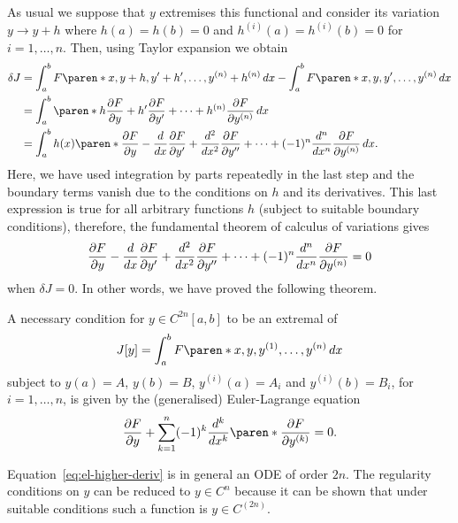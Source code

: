 \documentclass[11pt]{penrose}
\begin{document}
As usual we suppose that $y$ extremises this functional and consider its variation $y \to y + h$ where $h(a) = h(b) = 0$ and $h^{(i)}(a) = h^{(i)}(b) = 0$ for $i=1, \dots, n$. Then, using Taylor expansion we obtain
\begin{align}
    \delta J
    &= \int_a^b F\paren*{x, y+h, y'+h', \dots, y^{(n)}+h^{(n)}} \,dx
    - \int_a^b F\paren*{x, y, y', \dots, y^{(n)}} \,dx\\
    &= \int_a^b \paren*{h \frac{\pd F}{\pd y} + h' \frac{\pd F}{\pd y'} + \dots + h^{(n)} \frac{\pd F}{\pd y^{(n)}}} \,dx\\
    &= \int_a^b h(x) \paren*{ \frac{\pd F}{\pd y} - \frac{d}{dx} \frac{\pd F}{\pd y'} + \frac{d^2}{dx^2} \frac{\pd F}{\pd y''} + \dots + (-1)^n \frac{d^n}{dx^n} \frac{\pd F}{\pd y^{(n)}} } \,dx.
\end{align}
Here, we have used integration by parts repeatedly in the last step and the boundary terms vanish due to the conditions on $h$ and its derivatives. This last expression is true for all arbitrary functions $h$ (subject to suitable boundary conditions), therefore, the fundamental theorem of calculus of variations gives
\begin{equation}
    \frac{\partial F}{\partial y} - \frac{d}{dx} \frac{\partial F}{\partial y'} + \frac{d^2}{dx^2} \frac{\partial F}{\partial y''} + \dots + (-1)^n \frac{d^n}{dx^n} \frac{\partial F}{\partial y^{(n)}} = 0
\end{equation}
when $\delta J = 0$. In other words, we have proved the following theorem.

\begin{nthm}
    A necessary condition for $y \in C^{2n}[a,b]$ to be an extremal of
    \begin{equation}
        J[y] = \int_a^b F\paren*{x, y, y^{(1)}, \dots, y^{(n)}} \,dx
    \end{equation}
    subject to $y(a) = A$, $y(b) = B$, $y^{(i)}(a) = A_i$ and $y^{(i)}(b) = B_i$, for $i=1, \dots, n$, is given by the (generalised) Euler-Lagrange equation
    \begin{equation}
        \frac{\pd F}{\pd y} + \sum_{k=1}^{n} (-1)^k \frac{d^k}{dx^k} \paren*{\frac{\pd F}{\pd y^{(k)}}} = 0.
        \label{eq:el-higher-deriv}
    \end{equation}
\end{nthm}

Equation~\eqref{eq:el-higher-deriv} is in general an ODE of order $2n$. The regularity conditions on $y$ can be reduced to $y \in C^n$ because it can be shown that under suitable conditions such a function is $y \in C^{(2n)}$.
\end{document}
